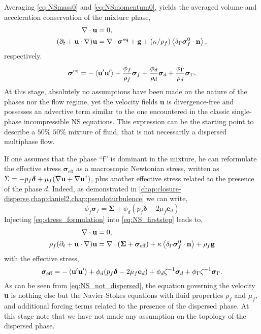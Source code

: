 Averaging \ref{eq:NSmass0} and \ref{eq:NSmomentum0}, yields the averaged volume and acceleration conservation of the mixture phase, 
\begin{align}
    \div\textbf{u} &=0,\\
    (\pddt   
    + \textbf{u} \cdot \grad )
    \textbf{u}
    &= 
    \div \bm{\sigma}^\text{eq} + 
    \textbf{g} 
    + (\kappa/\rho_f) \avg{\delta_\Gamma \bm{\sigma}_f^0 \cdot \textbf{n}},
    \label{eq:NS_firststep}
\end{align}
respectively. 
\begin{equation}
    \bm\sigma^\text{eq} = 
    - \left< \textbf{u}'\textbf{u}'\right>
    + \frac{\phi_f}{\rho_f}\bm\sigma_f
    + \frac{\phi_d}{\rho_d}\bm\sigma_d
    + \frac{\phi_\Gamma}{\rho_d} \bm\sigma_\Gamma. 
\end{equation}
At this stage, absolutely no assumptions have been made on the nature of the phases nor the flow regime, yet the velocity fields $\textbf{u}$ is divergence-free and possesses an advective term similar to the one encountered in the classic single-phase incompressible NS equations.
This expression can be the starting point to describe a $50\%$ $50\%$ mixture of fluid, that is not necessarily a dispersed multiphase flow. 

If one assumes that the phase ``f'' is dominant in the mixture, he can reformulate the effective stress $\bm\sigma_\text{eff}$ as a macroscopic Newtonian stress, written as $\Sigma = -  p_f \bm\delta  + \mu_f(\mathbf{\nabla} \textbf{u} + \mathbf{\nabla} \textbf{u}^\dagger)$, plus another effective stress related to the presence of the phase $d$.
Indeed, as demonstrated in \ref{chap:closure-disperse,chap:daniel2,chap:pseudoturbulence} we can write,
\begin{equation}
    \phi_f\bm\sigma_f
    = \bm\Sigma
    + \phi_d (p_f\bm\delta - 2\mu_f \textbf{e}_d)
    \label{eq:stress_formulation}
\end{equation}
Injecting \ref{eq:stress_formulation} into \ref{eq:NS_firststep} leads to, 
\begin{align}
    \label{eq:NS_not_dispersed_mass}
    \div\textbf{u}&=0, \\
    \rho_f (\pddt 
    + \textbf{u}\cdot \grad)
    \textbf{u}
    &= 
    \div( \bm\Sigma
    + \bm{\sigma}_\text{eff} )
    + \kappa \avg{\delta_\Gamma \bm{\sigma}_f^0 \cdot \textbf{n}} 
    + \rho_f \textbf{g} 
    \label{eq:NS_not_dispersed}
\end{align}
with the effective stress, 
\begin{equation}
    \bm\sigma_\text{eff} = 
    - \left< \textbf{u}'\textbf{u}'\right>
    + \phi_d (p_f\bm\delta - 2\mu_f \textbf{e}_d)
    + \phi_d \zeta^{-1} \bm\sigma_d
    + \phi_\Gamma \zeta^{-1} \bm\sigma_\Gamma. 
\end{equation}
As can be seen from \ref{eq:NS_not_dispersed}, the equation governing the velocity \textbf{u} is nothing else but the Navier-Stokes equations with fluid properties $\rho_f$ and $\mu_f$, and additional forcing terms related to the presence of the dispersed phase. 
At this stage note that we have not made any assumption on the topology of the dispersed phase. 

